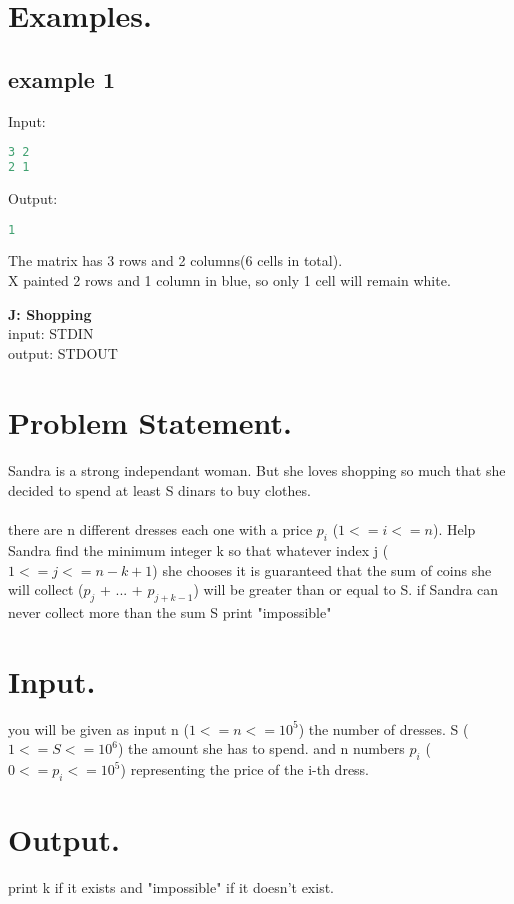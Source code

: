 \documentclass[10pt]{article}
\begin{document}
\section{Examples.}
\subsection{example 1}
Input:
\begin{lstlisting}[language=Python]
3 2
2 1
\end{lstlisting}
Output:
\begin{lstlisting}[language=Python]
1
\end{lstlisting}
The matrix has 3 rows and 2 columns(6 cells in total).\\
X painted 2 rows and 1 column in blue, so only 1 cell will remain white.
\newpage
\begin{center}
    \Huge { \textbf{J: Shopping}}\\
\normalsize  { input:  STDIN}\\
\normalsize{    output: STDOUT}
\end{center}
\section{Problem Statement.}
\paragraph{}
Sandra is a strong independant woman. But she loves shopping so much that she decided to spend at least S dinars to buy clothes.
\paragraph{}
there are n different dresses each one with a price $p_i$ ($1<=i<=n$).
Help Sandra find the minimum integer k so that whatever index j ($1<=j<=n-k+1$) she chooses it is guaranteed 
that the sum of coins she will collect ($p_j$ + ... + $p_{j+k-1}$) will be greater than or equal to S.
if Sandra can never collect more than the sum S print "impossible"
\section{Input.}
you will be given as input n ($1<=n<=10^5$) the number of dresses. S ($1<=S<=10^6$) the amount she has to spend.
and n numbers $p_i$ ($0<=p_i<=10^5$) representing the price of the i-th dress.
\section{Output.}
print k if it exists and "impossible" if it doesn't exist.
\end{document}
